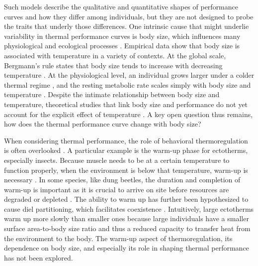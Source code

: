 Such models describe the qualitative and quantitative shapes of performance curves and how they differ among individuals, but they are not designed to probe the traits that underly those differences.  %
One intrinsic cause that might underlie variability in thermal performance curves is body size, which influences many physiological and ecological processes \citep{Calder1984,Schmidt1984,Peters1986}.
Empirical data show that body size is associated with temperature in a variety of contexts.
At the global scale, Bergmann's rule states that body size tends to increase with decreasing temperature \citep{Bergmann1847, Blackburn1999}.
At the physiological level, an individual grows larger under a colder thermal regime \citep{VanVoorhies1996}, and the resting metabolic rate scales simply with body size and temperature \citep{Kleiber1947, Peters1986, Gillooly2001, Brown2004}.
Despite the intimate relationship between body size and temperature, theoretical studies that link body size and performance do not yet account for the explicit effect of temperature \citep[e.g.,][]{Yodzis1992, Brown1993}.
A key open question thus remains, how does the thermal performance curve change with body size?

When considering thermal performance, the role of behavioral thermoregulation is often overlooked \citep{Kearney2009b}.
A particular example is the warm-up phase for ectotherms, especially insects.
Because muscle needs to be at a certain temperature to function properly, when the environment is below that temperature, warm-up is necessary \citep[e.g.,][]{Heinrich1975}.
In some species, like dung beetles, the duration and completion of warm-up is important as it is crucial to arrive on site before resources are degraded or depleted \citep{Hanski1991}. %
The ability to warm up has further been hypothesized to cause diel partitioning, which facilitates coexistence \citep{Viljanen2009}.
Intuitively, large ectotherms warm up more slowly than smaller ones because large individuals have a smaller surface area-to-body size ratio and thus a reduced capacity to transfer heat from the environment to the body.
The warm-up aspect of thermoregulation, its dependence on body size, and especially its role in shaping thermal performance has not been explored.

